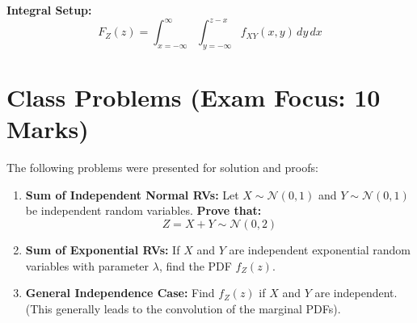 \documentclass[12pt]{article}
\begin{document}
\textbf{Integral Setup:}
$$ F_Z(z) = \int_{x=-\infty}^{\infty} \int_{y=-\infty}^{z-x} f_{XY}(x, y) \, dy \, dx $$

\section{Class Problems (Exam Focus: 10 Marks)}
The following problems were presented for solution and proofs:

\begin{enumerate}
    \item \textbf{Sum of Independent Normal RVs:}
    Let $X \sim \mathcal{N}(0, 1)$ and $Y \sim \mathcal{N}(0, 1)$ be independent random variables.
    \textbf{Prove that:} 
    $$ Z = X + Y \sim \mathcal{N}(0, 2) $$
    
    \item \textbf{Sum of Exponential RVs:}
    If $X$ and $Y$ are independent exponential random variables with parameter $\lambda$, find the PDF $f_Z(z)$.
    
    \item \textbf{General Independence Case:}
    Find $f_Z(z)$ if $X$ and $Y$ are independent. (This generally leads to the convolution of the marginal PDFs).
\end{enumerate}
\end{document}
